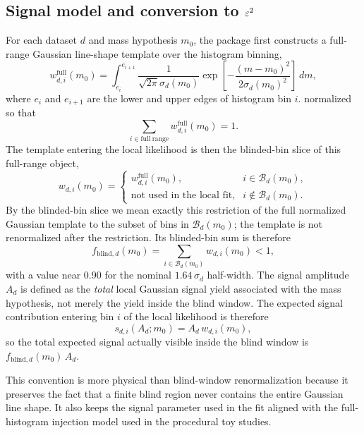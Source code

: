 \subsection{Signal model and conversion to \texorpdfstring{$\varepsilon^2$}{epsilon2}}

For each dataset $d$ and mass hypothesis $m_0$, the package first constructs a
full-range Gaussian line-shape template over the histogram binning,
\begin{equation}
w^{\mathrm{full}}_{d,i}(m_0) =
\int_{e_i}^{e_{i+1}}
\frac{1}{\sqrt{2\pi}\sigma_d(m_0)}
\exp\!\left[-\frac{(m-m_0)^2}{2\sigma_d(m_0)^2}\right]\,dm,
\end{equation}
where $e_i$ and $e_{i+1}$ are the lower and upper edges of histogram bin $i$.
normalized so that
\begin{equation}
\sum_{i \in \mathrm{full\ range}} w^{\mathrm{full}}_{d,i}(m_0) = 1.
\end{equation}
The template entering the local likelihood is then the blinded-bin slice of this
full-range object,
\begin{equation}
w_{d,i}(m_0) =
\begin{cases}
w^{\mathrm{full}}_{d,i}(m_0), & i \in \mathcal{B}_d(m_0), \\
\text{not used in the local fit}, & i \notin \mathcal{B}_d(m_0).
\end{cases}
\end{equation}
By the blinded-bin slice we mean exactly this restriction of the full normalized
Gaussian template to the subset of bins in $\mathcal{B}_d(m_0)$; the template is not
renormalized after the restriction.
Its blinded-bin sum is therefore
\begin{equation}
f_{\mathrm{blind},d}(m_0) = \sum_{i \in \mathcal{B}_d(m_0)} w_{d,i}(m_0) < 1,
\end{equation}
with a value near 0.90 for the nominal $1.64\,\sigma_d$ half-width. The signal
amplitude $A_d$ is defined as the \emph{total} local Gaussian signal yield associated
with the mass hypothesis, not merely the yield inside the blind window. The expected
signal contribution entering bin $i$ of the local likelihood is therefore
\begin{equation}
s_{d,i}(A_d;m_0) = A_d\,w_{d,i}(m_0),
\end{equation}
so the total expected signal actually visible inside the blind window is
$f_{\mathrm{blind},d}(m_0)\,A_d$.

This convention is more physical than blind-window renormalization because it preserves
the fact that a finite blind region never contains the entire Gaussian line shape. It
also keeps the signal parameter used in the fit aligned with the full-histogram
injection model used in the procedural toy studies.

